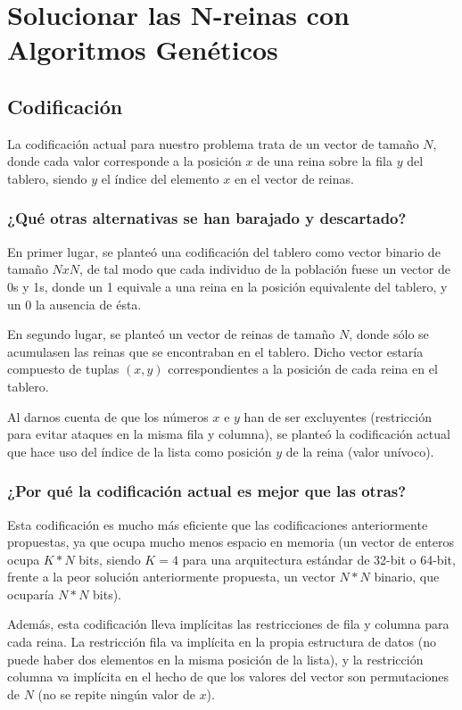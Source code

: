 \documentclass[12pt]{article}
\begin{document}
\newpage
\section{Solucionar las N-reinas con Algoritmos Genéticos}

\subsection{Codificación}

La codificación actual para nuestro problema trata de un vector de tamaño $N$, donde cada valor corresponde a la posición $x$ de una reina sobre la fila $y$ del tablero, siendo $y$ el índice del elemento $x$ en el vector de reinas.

\subsubsection{¿Qué otras alternativas se han barajado y descartado?}

En primer lugar, se planteó una codificación del tablero como vector binario de tamaño $NxN$, de tal modo que cada individuo de la población fuese un vector de 0s y 1s, donde un 1 equivale a una reina en la posición equivalente del tablero, y un 0 la ausencia de ésta.

En segundo lugar, se planteó un vector de reinas de tamaño $N$, donde sólo se acumulasen las reinas que se encontraban en el tablero. Dicho vector estaría compuesto de tuplas $(x,y)$ correspondientes a la posición de cada reina en el tablero.

Al darnos cuenta de que los números $x$ e $y$ han de ser excluyentes (restricción para evitar ataques en la misma fila y columna), se planteó la codificación actual que hace uso del índice de la lista como posición $y$ de la reina (valor unívoco).

\subsubsection{¿Por qué la codificación actual es mejor que las otras?}

Esta codificación es mucho más eficiente que las codificaciones anteriormente propuestas, ya que ocupa mucho menos espacio en memoria (un vector de enteros ocupa $K*N$ bits, siendo $K=4$ para una arquitectura estándar de 32-bit o 64-bit, frente a la peor solución anteriormente propuesta, un vector $N*N$ binario, que ocuparía $N*N$ bits).

Además, esta codificación lleva implícitas las restricciones de fila y columna para cada reina. La restricción fila va implícita en la propia estructura de datos (no puede haber dos elementos en la misma posición de la lista), y la restricción columna va implícita en el hecho de que los valores del vector son permutaciones de $N$ (no se repite ningún valor de $x$).
\end{document}
